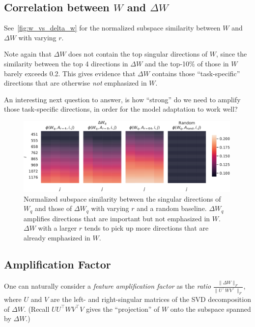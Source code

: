 \documentclass{article} %
\begin{document}
\subsection{Correlation between $W$ and $\Delta W$}
\label{app:corr_w_delta_w}

See~\autoref{fig:w_vs_delta_w} for the normalized subspace similarity between $W$ and $\Delta W$ with varying $r$.

Note again that $\Delta W$ does not contain the top singular directions of $W$, since the similarity between the top 4 directions in $\Delta W$ and the top-10\% of those in $W$ barely exceeds 0.2. This gives evidence that $\Delta W$ contains those ``task-specific'' directions that are otherwise \emph{not} emphasized in $W$.

An interesting next question to answer, is how ``strong'' do we need to amplify those task-specific directions, in order for the model adaptation to work well?

\begin{figure}[h]
  \centering
    \includegraphics[width=0.99\textwidth]{figures/w_vs_delta_w.pdf}
    \caption{Normalized subspace similarity between the singular directions of $W_q$ and those of $\Delta W_q$ with varying $r$ and a random baseline. $\Delta W_q$ amplifies directions that are important but not emphasized in $W$. $\Delta W$ with a larger $r$ tends to pick up more directions that are already emphasized in $W$.}
    \label{fig:w_vs_delta_w}
\end{figure}

\subsection{Amplification Factor}
\label{app:amplification_factor}

One can naturally consider a \emph{feature amplification factor} as the \emph{ratio} $\frac{\|\Delta W\|_F}{\|U^\top WV^\top\|_F}$, where $U$ and $V$ are the left- and right-singular matrices of the SVD decomposition of $\Delta W$. (Recall $UU^\top WV^\top V$ gives the ``projection'' of $W$ onto the subspace spanned by $\Delta W$.)
\end{document}
